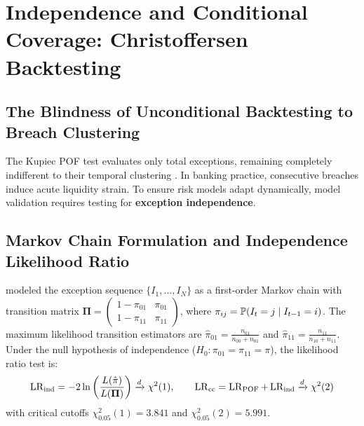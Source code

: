 
\section{Independence and Conditional Coverage: Christoffersen Backtesting}
\label{sec:christoffersen_backtesting}

\subsection{The Blindness of Unconditional Backtesting to Breach Clustering}

The Kupiec POF test evaluates only total exceptions, remaining completely indifferent to their temporal clustering \citep{christoffersen1998evaluating}. In banking practice, consecutive breaches induce acute liquidity strain. To ensure risk models adapt dynamically, model validation requires testing for \textbf{exception independence}.

\subsection{Markov Chain Formulation and Independence Likelihood Ratio}

\citet{christoffersen1998evaluating} modeled the exception sequence $\{I_1, \dots, I_N\}$ as a first-order Markov chain with transition matrix $\bm{\Pi} = \begin{pmatrix} 1-\pi_{01} & \pi_{01} \\ 1-\pi_{11} & \pi_{11} \end{pmatrix}$, where $\pi_{ij} = \mathbb{P}(I_t = j \mid I_{t-1} = i)$. The maximum likelihood transition estimators are $\hat{\pi}_{01} = \frac{n_{01}}{n_{00} + n_{01}}$ and $\hat{\pi}_{11} = \frac{n_{11}}{n_{10} + n_{11}}$. Under the null hypothesis of independence ($H_0: \pi_{01} = \pi_{11} = \pi$), the likelihood ratio test is:
\begin{equation}
    \operatorname{LR}_{\text{ind}} = -2 \ln \left( \frac{L(\hat{\pi})}{L(\bm{\Pi})} \right) \xrightarrow{d} \chi^2(1), \qquad \operatorname{LR}_{\text{cc}} = \operatorname{LR}_{\operatorname{POF}} + \operatorname{LR}_{\text{ind}} \xrightarrow{d} \chi^2(2)
    \label{eq:lr_cc_formula}
\end{equation}
with critical cutoffs $\chi^2_{0.05}(1) = 3.841$ and $\chi^2_{0.05}(2) = 5.991$.

